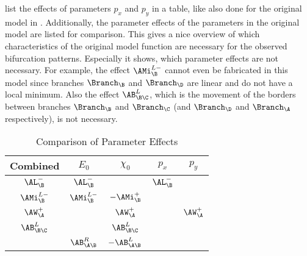 list the effects of parameters $p_x$ and $p_y$ in a table, like also done for the original model in .
Additionally, the parameter effects of the parameters in the original model are listed for comparison.
This gives a nice overview of which characteristics of the original model function are necessary for the observed bifurcation patterns.
Especially it shows, which parameter effects are not necessary.
For example, the effect $\AMi_{\B}^{L-}$ cannot even be fabricated in this model since branches $\Branch_\B$ and $\Branch_\D$ are linear and do not have a local minimum.
Also the effect $\AB_{\B\C}^L$, which is the movement of the borders between branches $\Branch_\B$ and $\Branch_\C$ (and $\Branch_\D$ and $\Branch_\A$ respectively), is not necessary.

\begin{table}
    \centering
    \begin{tabular}{|c||c|c||c|c|} \hline
        Combined         & $E_0$            & $\chi_0$          & $p_x$        & $p_y$          \\ \hline \hline
        $\AL_{\B}^{-}$   & $\AL_{\B}^{-}$   &                   & $\AL_{\B}^-$ &                \\ \hline
        $\AMi_{\B}^{L-}$ & $\AMi_{\B}^{L-}$ & $-\AMi_{\B}^{+}$  &              &                \\ \hline
        $\AW_{\A}^{+}$   &                  & $\AW_{\A}^{+}$    &              & $\AW_{\A}^{+}$ \\ \hline \hline
        $\AB_{\B\C}^{L}$ &                  & $\AB_{\B\C}^{L}$  &              &                \\ \hline
                         & $\AB_{\A\B}^{R}$ & $-\AB_{\A\B}^{L}$ &              &                \\ \hline
    \end{tabular}
    \caption{Comparison of Parameter Effects}
    \label{tab:final.def.parameters.effects}
\end{table}

